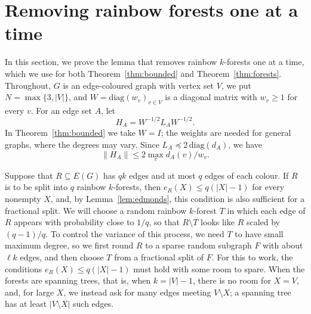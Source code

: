 \section{Removing rainbow forests one at a time}\label{sec:extraction}
In this section, we prove the lemma that removes rainbow $k$-forests one at a time, which we use for both Theorem~\ref{thm:bounded} and Theorem~\ref{thm:forests}.
Throughout, $G$ is an edge-coloured graph with vertex set $V$, we put $N=\max\{3,|V|\}$, and $W=\mathrm{diag}(w_v)_{v\in V}$ is a diagonal matrix with $w_v\ge1$ for every $v$.
For an edge set $A$, let
\[
H_A=W^{-1/2}L_AW^{-1/2}.
\]
In Theorem~\ref{thm:bounded} we take $W=I$; the weights are needed for general graphs, where the degrees may vary.
Since $L_A\preceq2\,\mathrm{diag}(d_A)$, we have
\begin{equation}\label{eq:Hnorm}
\|H_A\|\le2\max_{v}d_A(v)/w_v .
\end{equation}

Suppose that $R\subseteq E(G)$ has $qk$ edges and at most $q$ edges of each colour.
If $R$ is to be split into $q$ rainbow $k$-forests, then $e_R(X)\le q(|X|-1)$ for every nonempty $X$, and, by Lemma~\ref{lem:edmonds}, this condition is also sufficient for a fractional split.
We will choose a random rainbow $k$-forest $T$ in which each edge of $R$ appears with probability close to $1/q$, so that $R\setminus T$ looks like $R$ scaled by $(q-1)/q$.
To control the variance of this process, we need $T$ to have small maximum degree, so we first round $R$ to a sparse random subgraph $F$ with about $\ell k$ edges, and then choose $T$ from a fractional split of $F$.
For this to work, the conditions $e_R(X)\le q(|X|-1)$ must hold with some room to spare.
When the forests are spanning trees, that is, when $k=|V|-1$, there is no room for $X=V$, and, for large $X$, we instead ask for many edges meeting $V\setminus X$; a spanning tree has at least $|V\setminus X|$ such edges.

